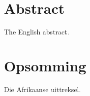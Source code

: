 \chapter*{Abstract}
\makeatletter{}\makeatother

The English abstract.



\chapter*{Opsomming}
\makeatletter{}\makeatother

Die Afrikaanse uittreksel.

